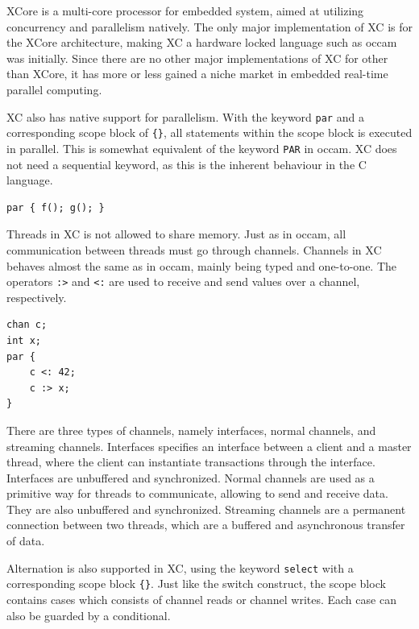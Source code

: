 XCore is a multi-core processor for embedded system, aimed at utilizing concurrency and parallelism natively. The only major implementation of XC is for the XCore architecture, making XC a hardware locked language such as occam was initially. Since there are no other major implementations of XC for other than XCore, it has more or less gained a niche market in embedded real-time parallel computing.

XC also has native support for parallelism. With the keyword \texttt{par} and a corresponding scope block of \texttt{\{\}}, all statements within the scope block is executed in parallel. This is somewhat equivalent of the keyword \texttt{PAR} in occam. XC does not need a sequential keyword, as this is the inherent behaviour in the C language. 

\begin{lstlisting}[style={CustomC},frame={},numbers={none},xleftmargin={4em}]
par { f(); g(); }
\end{lstlisting}

Threads in XC is not allowed to share memory. Just as in occam, all communication between threads must go through channels. Channels in XC behaves almost the same as in occam, mainly being typed and one\hyp{}to\hyp{}one. The operators \texttt{:>} and \texttt{<:} are used to receive and send values over a channel, respectively. 

\noindent\begin{minipage}{\textwidth}
\begin{lstlisting}[style={CustomC},frame={},numbers={none},xleftmargin={4em}]
chan c;
int x;
par {
    c <: 42;
    c :> x;
}
\end{lstlisting}
\end{minipage}

There are three types of channels, namely interfaces, normal channels, and streaming channels. Interfaces specifies an interface between a client and a master thread, where the client can instantiate transactions through the interface. Interfaces are unbuffered and synchronized. Normal channels are used as a primitive way for threads to communicate, allowing to send and receive data. They are also unbuffered and synchronized. Streaming channels are a permanent connection between two threads, which are a buffered and asynchronous transfer of data.

Alternation is also supported in XC, using the keyword \texttt{select} with a corresponding scope block \texttt{\{\}}. Just like the switch construct, the scope block contains cases which consists of channel reads or channel writes. Each case can also be guarded by a conditional.

